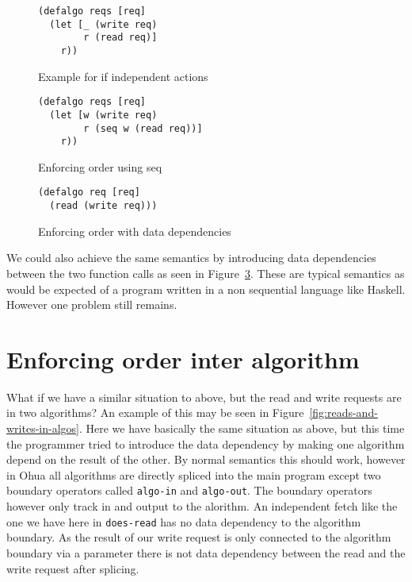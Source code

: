 \begin{figure}
\begin{verbatim}
(defalgo reqs [req]
  (let [_ (write req)
        r (read req)]
    r))
\end{verbatim}
\caption{Example for if independent actions}
\label{fig:independent-actions-code}
\end{figure}

\begin{figure}
\begin{verbatim}
(defalgo reqs [req]
  (let [w (write req)
        r (seq w (read req))]
    r))
\end{verbatim}
\caption{Enforcing order using seq}
\label{fig:enforcing-order-with-seq}
\end{figure}

\begin{figure}
\begin{verbatim}
(defalgo req [req]
  (read (write req)))
\end{verbatim}
\caption{Enforcing order with data dependencies}
\label{fig:enforcing-order-with-dd}
\end{figure}

We could also achieve the same semantics by introducing data dependencies between the two function calls as seen in Figure~\ref{fig:enforcing-order-with-dd}.
These are typical semantics as would be expected of a program written in a non sequential language like Haskell.
However one problem still remains.

\section{Enforcing order inter algorithm}

What if we have a similar situation to above, but the read and write requests are in two algorithms?
An example of this may be seen in Figure~\ref{fig:reads-and-writes-in-algos}.
Here we have basically the same situation as above, but this time the programmer tried to introduce the data dependency by making one algorithm depend on the result of the other.
By normal semantics this should work, however in Ohua all algorithms are directly spliced into the main program except two boundary operators called \texttt{algo-in} and \texttt{algo-out}.
The boundary operators however only track in and output to the alorithm.
An independent fetch like the one we have here in \texttt{does-read} has no data dependency to the algorithm boundary.
As the result of our write request is only connected to the algorithm boundary via a parameter there is not data dependency between the read and the write request after splicing.

